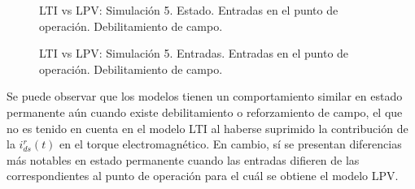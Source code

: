 \documentclass[a4paper, 10pt, onecolumn,journal]{ieeeconf}
\begin{document}
\begin{figure}[H]
	\centering
	\begin{adjustbox}{max width=\columnwidth}
	\end{adjustbox}
	\caption{LTI vs LPV: Simulación 5. Estado. Entradas en el punto de operación. Debilitamiento de campo.}
	\label{simulación 5 estado}
\end{figure}

\begin{figure}[H]
	\centering
	\begin{adjustbox}{scale=0.7,max width=\columnwidth}
	\end{adjustbox}
	\caption{LTI vs LPV: Simulación 5. Entradas. Entradas en el punto de operación. Debilitamiento de campo.}
	\label{simulación 5 entradas}
\end{figure}

Se puede observar que los modelos tienen un comportamiento
similar en estado permanente aún cuando existe debilitamiento o reforzamiento de campo, el que no es tenido en cuenta
en el modelo LTI al haberse suprimido la contribución de la $i^r_{ds}(t)$ en el torque electromagnético.
En cambio, sí se presentan diferencias más notables en estado permanente cuando las entradas difieren de las correspondientes al 
punto de operación para el cuál se obtiene el modelo LPV.
\end{document}
